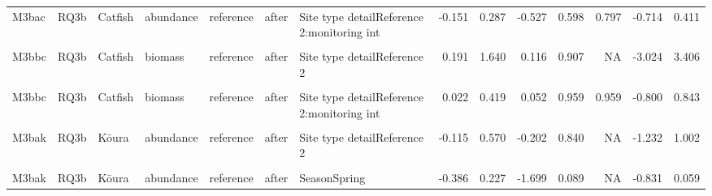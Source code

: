 \documentclass[
  12pt,
  a4paper,
  oneside]{scrbook}
\begin{document}
\begin{landscape}
\begin{longtable}[t]{lllllllrrrrrrr}
M3bac & RQ3b & Catfish & abundance & reference & after & Site type detailReference 2:monitoring int & -0.151 & 0.287 & -0.527 & 0.598 & 0.797 & -0.714 & 0.411\\
\addlinespace
\cellcolor{gray!8}{M3bbc} & \cellcolor{gray!8}{RQ3b} & \cellcolor{gray!8}{Catfish} & \cellcolor{gray!8}{biomass} & \cellcolor{gray!8}{reference} & \cellcolor{gray!8}{after} & \cellcolor{gray!8}{(Intercept)} & \cellcolor{gray!8}{2.726} & \cellcolor{gray!8}{1.556} & \cellcolor{gray!8}{1.752} & \cellcolor{gray!8}{0.080} & \cellcolor{gray!8}{NA} & \cellcolor{gray!8}{-0.324} & \cellcolor{gray!8}{5.775}\\
M3bbc & RQ3b & Catfish & biomass & reference & after & Site type detailReference 2 & 0.191 & 1.640 & 0.116 & 0.907 & NA & -3.024 & 3.406\\
\cellcolor{gray!8}{M3bbc} & \cellcolor{gray!8}{RQ3b} & \cellcolor{gray!8}{Catfish} & \cellcolor{gray!8}{biomass} & \cellcolor{gray!8}{reference} & \cellcolor{gray!8}{after} & \cellcolor{gray!8}{monitoring int} & \cellcolor{gray!8}{-0.227} & \cellcolor{gray!8}{0.301} & \cellcolor{gray!8}{-0.754} & \cellcolor{gray!8}{0.451} & \cellcolor{gray!8}{NA} & \cellcolor{gray!8}{-0.816} & \cellcolor{gray!8}{0.363}\\
M3bbc & RQ3b & Catfish & biomass & reference & after & Site type detailReference 2:monitoring int & 0.022 & 0.419 & 0.052 & 0.959 & 0.959 & -0.800 & 0.843\\
\cellcolor{gray!8}{M3bak} & \cellcolor{gray!8}{RQ3b} & \cellcolor{gray!8}{Kōura} & \cellcolor{gray!8}{abundance} & \cellcolor{gray!8}{reference} & \cellcolor{gray!8}{after} & \cellcolor{gray!8}{(Intercept)} & \cellcolor{gray!8}{0.380} & \cellcolor{gray!8}{0.790} & \cellcolor{gray!8}{0.480} & \cellcolor{gray!8}{0.631} & \cellcolor{gray!8}{NA} & \cellcolor{gray!8}{-1.169} & \cellcolor{gray!8}{1.928}\\
\addlinespace
M3bak & RQ3b & Kōura & abundance & reference & after & Site type detailReference 2 & -0.115 & 0.570 & -0.202 & 0.840 & NA & -1.232 & 1.002\\
\cellcolor{gray!8}{M3bak} & \cellcolor{gray!8}{RQ3b} & \cellcolor{gray!8}{Kōura} & \cellcolor{gray!8}{abundance} & \cellcolor{gray!8}{reference} & \cellcolor{gray!8}{after} & \cellcolor{gray!8}{monitoring int} & \cellcolor{gray!8}{-0.019} & \cellcolor{gray!8}{0.062} & \cellcolor{gray!8}{-0.302} & \cellcolor{gray!8}{0.763} & \cellcolor{gray!8}{NA} & \cellcolor{gray!8}{-0.141} & \cellcolor{gray!8}{0.103}\\
M3bak & RQ3b & Kōura & abundance & reference & after & SeasonSpring & -0.386 & 0.227 & -1.699 & 0.089 & NA & -0.831 & 0.059\\

\end{longtable}
\end{landscape}
\end{document}
